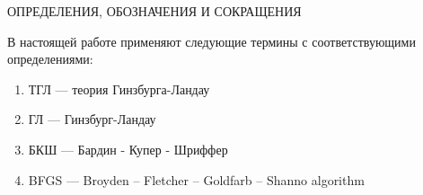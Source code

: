 \begin{center}
	ОПРЕДЕЛЕНИЯ, ОБОЗНАЧЕНИЯ И СОКРАЩЕНИЯ
\end{center}

В настоящей работе применяют следующие термины с соответствующими 
определениями:
\begin{enumerate}
    \item ТГЛ --- теория Гинзбурга-Ландау
    \item ГЛ --- Гинзбург-Ландау
    \item БКШ --- Бардин - Купер - Шриффер
    \item BFGS --- Broyden -- Fletcher -- Goldfarb -- Shanno algorithm
\end{enumerate}

\newpage